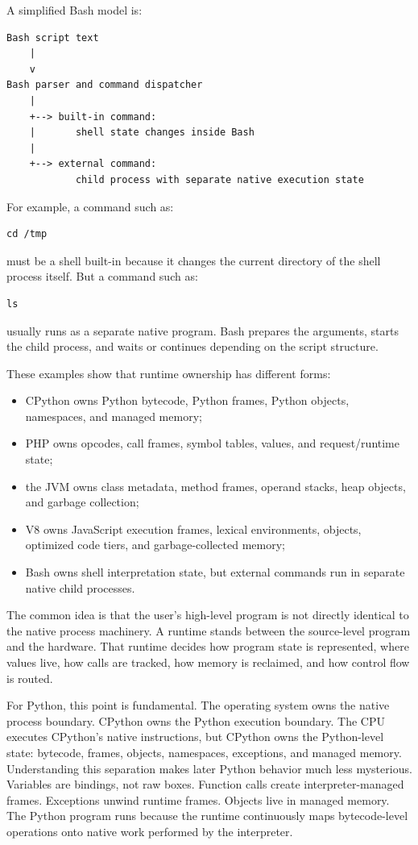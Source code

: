 A simplified Bash model is:

\begin{verbatim}
Bash script text
    |
    v
Bash parser and command dispatcher
    |
    +--> built-in command:
    |       shell state changes inside Bash
    |
    +--> external command:
            child process with separate native execution state
\end{verbatim}

For example, a command such as:

\begin{verbatim}
cd /tmp
\end{verbatim}

must be a shell built-in because it changes the current directory of the shell process itself. But a command such as:

\begin{verbatim}
ls
\end{verbatim}

usually runs as a separate native program. Bash prepares the arguments, starts the child process, and waits or continues depending on the script structure.

These examples show that runtime ownership has different forms:

\begin{itemize}
    \item CPython owns Python bytecode, Python frames, Python objects, namespaces, and managed memory;
    \item PHP owns opcodes, call frames, symbol tables, values, and request/runtime state;
    \item the JVM owns class metadata, method frames, operand stacks, heap objects, and garbage collection;
    \item V8 owns JavaScript execution frames, lexical environments, objects, optimized code tiers, and garbage-collected memory;
    \item Bash owns shell interpretation state, but external commands run in separate native child processes.
\end{itemize}

The common idea is that the user's high-level program is not directly identical to the native process machinery. A runtime stands between the source-level program and the hardware. That runtime decides how program state is represented, where values live, how calls are tracked, how memory is reclaimed, and how control flow is routed.

For Python, this point is fundamental. The operating system owns the native process boundary. CPython owns the Python execution boundary. The CPU executes CPython's native instructions, but CPython owns the Python-level state: bytecode, frames, objects, namespaces, exceptions, and managed memory. Understanding this separation makes later Python behavior much less mysterious. Variables are bindings, not raw boxes. Function calls create interpreter-managed frames. Exceptions unwind runtime frames. Objects live in managed memory. The Python program runs because the runtime continuously maps bytecode-level operations onto native work performed by the interpreter.
